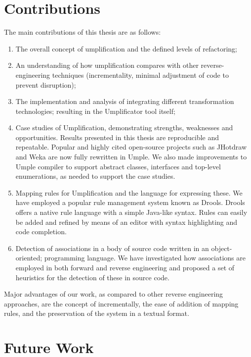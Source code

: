 \section{Contributions}

The main contributions of this thesis are as follows:

\begin{enumerate}
\item The overall concept of umplification and the defined levels of refactoring;

\item An understanding of how umplification compares with other reverse-engineering techniques (incrementality, minimal adjustment of code to prevent disruption);

\item The implementation and analysis of integrating different transformation technologies;  resulting in the Umplificator tool itself;

\item Case studies of Umplification, demonstrating strengths, weaknesses and opportunities. Results presented in this thesis are reproducible and repeatable. Popular and highly cited open-source projects such as JHotdraw and Weka are now fully rewritten in Umple. We also made improvements to Umple compiler  to support abstract classes, interfaces and top-level enumerations, as needed to support the case studies.

\item Mapping rules for Umplification and the language for expressing these. We have employed a popular rule management system known as Drools. Drools offers a native rule language with a simple Java-like syntax. Rules can easily be added and refined by means of an editor with syntax highlighting and code completion.

\item Detection of associations in a body of source code written in an object-oriented;
programming language. We have investigated how associations are employed in both forward and reverse engineering and proposed a set of heuristics for the detection of these in source code.
\end{enumerate}

Major advantages of our work, as compared to other reverse engineering approaches, are the concept of incrementally, the ease of addition of mapping rules, and the preservation of the system in a textual format.

\section{Future Work}

